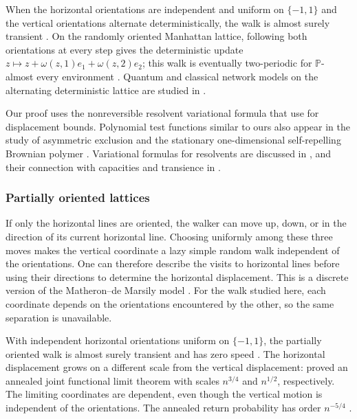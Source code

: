 \documentclass[11pt]{amsart}
\theoremstyle{plain}
\theoremstyle{definition}
\renewcommand{\P}{\mathbb P}
\newcommand{\1}{\mathbf 1}
\begin{document}
	When the horizontal orientations are independent and uniform on
	$\{-1,1\}$ and the vertical orientations alternate deterministically,
	the walk is almost surely transient \citep*[Theorem~9]{Bos19}.
	On the randomly oriented Manhattan lattice, following both orientations at every
	step gives the deterministic update
	$z\mapsto z+\omega(z,1)e_1+\omega(z,2)e_2$; this walk is eventually
	two-periodic for $\P$-almost every environment
	\citep*[Theorem~1]{CHT19}.  Quantum and classical network models on
	the alternating deterministic lattice are studied in
	\citet*{BOC03}.
	
	Our proof uses the nonreversible resolvent variational formula
	\citep*[Theorem~4.1]{KLO12} that \citet*[Section~2]{LTV18} use for displacement bounds.
	Polynomial test functions similar to ours also appear in the study of asymmetric exclusion
	\citep*[Sections~3--4]{LQSY04} \citep*[Section~2]{Yau04} and the
	stationary one-dimensional self-repelling Brownian polymer
	\citep*{TTV12}.  Variational formulas for
	resolvents are discussed in \citet*[(39)]{Tot18}, and their connection
	with capacities and transience in \citet*[Theorem~2.4]{GL14}.
	
	\subsubsection{Partially oriented lattices}
	
	If only the horizontal lines are oriented, the walker can move up,
	down, or in the direction of its current horizontal line.  Choosing
	uniformly among these three moves makes the vertical coordinate a
	lazy simple random walk independent of the orientations.  One can
	therefore describe the visits to horizontal lines before using their
	directions to determine the horizontal displacement.  This is a
	discrete version of the Matheron--de Marsily model
	\citep*{MdM80}.  For the walk studied here, each coordinate
	depends on the orientations encountered by the other, so the same
	separation is unavailable.
	
	With independent horizontal orientations uniform on $\{-1,1\}$,
	the partially oriented walk is almost surely transient
	\citep*[Theorem~1.8]{CP03} and has zero speed
	\citep*[Theorem~2.11]{CP04}.  The horizontal displacement grows on
	a different scale from the vertical displacement:
	\citet*[Theorem~2]{GLN08F} proved an annealed joint functional limit
	theorem with scales $n^{3/4}$ and $n^{1/2}$, respectively.
	The limiting coordinates are dependent, even though the vertical
	motion is independent of the orientations.  The annealed return
	probability has order $n^{-5/4}$ 
	\citep*[Theorem~20]{CGPS11}.
	
\end{document}

